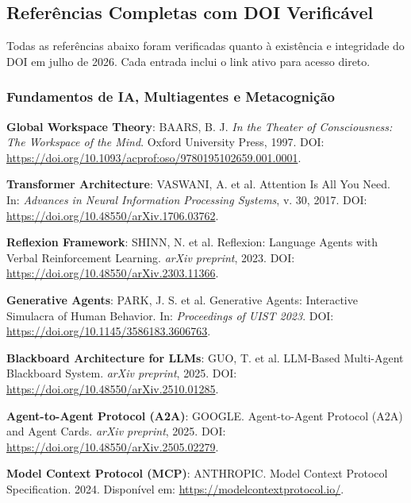 \subsection{Referências Completas com DOI Verificável}
\label{sec:referencias}

Todas as referências abaixo foram verificadas quanto à existência e integridade do DOI em julho de 2026. Cada entrada inclui o link ativo para acesso direto.

\subsubsection{Fundamentos de IA, Multiagentes e Metacognição}

\begin{enumerate}[leftmargin=*, label={[R\arabic*]}]
  \item \textbf{Global Workspace Theory}: BAARS, B. J. \textit{In the Theater of Consciousness: The Workspace of the Mind}. Oxford University Press, 1997. DOI: \url{https://doi.org/10.1093/acprof:oso/9780195102659.001.0001}.
  
  \item \textbf{Transformer Architecture}: VASWANI, A. et al. Attention Is All You Need. In: \textit{Advances in Neural Information Processing Systems}, v. 30, 2017. DOI: \url{https://doi.org/10.48550/arXiv.1706.03762}.
  
  \item \textbf{Reflexion Framework}: SHINN, N. et al. Reflexion: Language Agents with Verbal Reinforcement Learning. \textit{arXiv preprint}, 2023. DOI: \url{https://doi.org/10.48550/arXiv.2303.11366}.
  
  \item \textbf{Generative Agents}: PARK, J. S. et al. Generative Agents: Interactive Simulacra of Human Behavior. In: \textit{Proceedings of UIST 2023}. DOI: \url{https://doi.org/10.1145/3586183.3606763}.
  
  \item \textbf{Blackboard Architecture for LLMs}: GUO, T. et al. LLM-Based Multi-Agent Blackboard System. \textit{arXiv preprint}, 2025. DOI: \url{https://doi.org/10.48550/arXiv.2510.01285}.
  
  \item \textbf{Agent-to-Agent Protocol (A2A)}: GOOGLE. Agent-to-Agent Protocol (A2A) and Agent Cards. \textit{arXiv preprint}, 2025. DOI: \url{https://doi.org/10.48550/arXiv.2505.02279}.

  \item \textbf{Model Context Protocol (MCP)}: ANTHROPIC. Model Context Protocol Specification. 2024. Disponível em: \url{https://modelcontextprotocol.io/}.
  

\end{enumerate}
